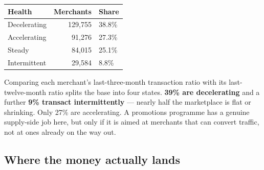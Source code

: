\documentclass[
]{article}
\newcounter{none} %
\begin{document}
{\def\LTcaptype{none} %
\begin{longtable}[]{@{}lrl@{}}
\toprule\noalign{}
Health & Merchants & Share \\
\midrule\noalign{}
\endhead
\bottomrule\noalign{}
\endlastfoot
Decelerating & 129,755 & 38.8\% \\
Accelerating & 91,276 & 27.3\% \\
Steady & 84,015 & 25.1\% \\
Intermittent & 29,584 & 8.8\% \\
\end{longtable}
}

Comparing each merchant's last-three-month transaction ratio with its
last-twelve-month ratio splits the base into four states. \textbf{39\%
are decelerating} and a further \textbf{9\% transact intermittently} ---
nearly half the marketplace is flat or shrinking. Only 27\% are
accelerating. A promotions programme has a genuine supply-side job here,
but only if it is aimed at merchants that can convert traffic, not at
ones already on the way out.

\subsection{Where the money actually
lands}\label{where-the-money-actually-lands}
\end{document}
